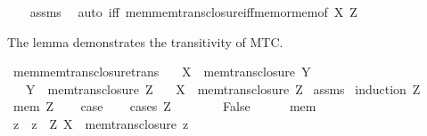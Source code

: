 \begin{isabellebody}
%
\isadelimproof
\ \ %
\endisadelimproof
%
\isatagproof
{}\isamarkupfalse%
\ assms\ \isamarkupfalse%
\ {\isacharparenleft}{\kern0pt}auto\ iff{\isacharcolon}{\kern0pt}\ mem{\isacharunderscore}{\kern0pt}mem{\isacharunderscore}{\kern0pt}trans{\isacharunderscore}{\kern0pt}closure{\isacharunderscore}{\kern0pt}iff{\isacharunderscore}{\kern0pt}mem{\isacharunderscore}{\kern0pt}or{\isacharunderscore}{\kern0pt}mem{\isacharbrackleft}{\kern0pt}of\ X\ Z{\isacharbrackright}{\kern0pt}{\isacharparenright}{\kern0pt}%
\endisatagproof
{\isafoldproof}%
%
\isadelimproof
%
\endisadelimproof
%
\begin{isamarkuptext}%
The lemma demonstrates the transitivity of MTC.%
\end{isamarkuptext}\isamarkuptrue%
\isamarkupfalse%
\ mem{\isacharunderscore}{\kern0pt}mem{\isacharunderscore}{\kern0pt}trans{\isacharunderscore}{\kern0pt}closure{\isacharunderscore}{\kern0pt}trans{\isacharcolon}{\kern0pt}\isanewline
\ \ \ {\isachardoublequoteopen}X\ {\isasymin}\ mem{\isacharunderscore}{\kern0pt}trans{\isacharunderscore}{\kern0pt}closure\ Y{\isachardoublequoteclose}\isanewline
\ \ \ {\isachardoublequoteopen}Y\ {\isasymin}\ mem{\isacharunderscore}{\kern0pt}trans{\isacharunderscore}{\kern0pt}closure\ Z{\isachardoublequoteclose}\isanewline
\ \ \ {\isachardoublequoteopen}X\ {\isasymin}\ mem{\isacharunderscore}{\kern0pt}trans{\isacharunderscore}{\kern0pt}closure\ Z{\isachardoublequoteclose}\isanewline
%
\isadelimproof
%
\endisadelimproof
%
\isatagproof
{}\isamarkupfalse%
\ assms\isanewline
{}\isamarkupfalse%
\ {\isacharparenleft}{\kern0pt}induction\ Z{\isacharparenright}{\kern0pt}\isanewline
\ \ \isamarkupfalse%
\ {\isacharparenleft}{\kern0pt}mem\ Z{\isacharparenright}{\kern0pt}\isanewline
\ \ \isamarkupfalse%
\ {\isacharquery}{\kern0pt}case\isanewline
\ \ \isamarkupfalse%
\ {\isacharparenleft}{\kern0pt}cases\ {\isachardoublequoteopen}Z\ {\isacharequal}{\kern0pt}\ {\isacharbraceleft}{\kern0pt}{\isacharbraceright}{\kern0pt}{\isachardoublequoteclose}{\isacharparenright}{\kern0pt}\isanewline
\ \ \ \ \isamarkupfalse%
\ False\isanewline
\ \ \ \ \isamarkupfalse%
\ mem\ \isamarkupfalse%
\ z\ \ {\isachardoublequoteopen}z\ {\isasymin}\ Z{\isachardoublequoteclose}\ {\isachardoublequoteopen}X\ {\isasymin}\ mem{\isacharunderscore}{\kern0pt}trans{\isacharunderscore}{\kern0pt}closure\ z{\isachardoublequoteclose}\ \isamarkupfalse%

\end{isabellebody}
